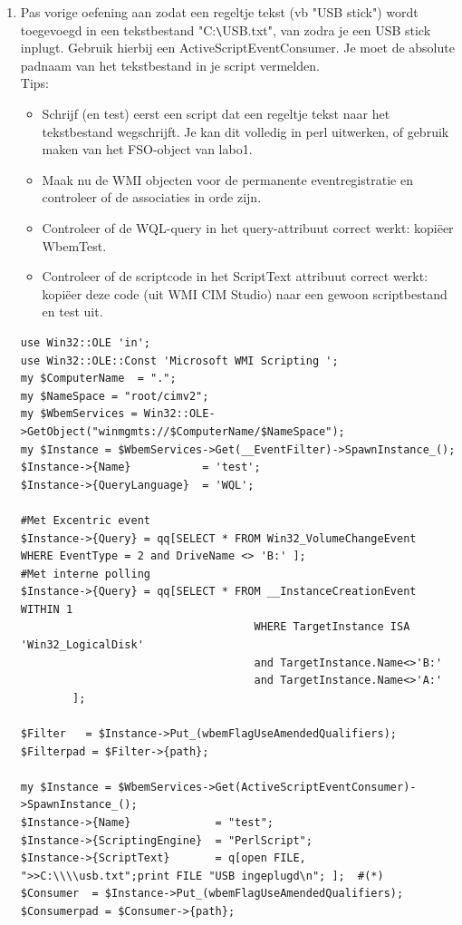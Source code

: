 \documentclass[11pt,a4paper]{report}
\begin{document}
\begin{enumerate}[resume]
	\item Pas vorige oefening aan zodat een regeltje tekst (vb "USB stick") wordt toegevoegd in een tekstbestand "C:\verb+\+USB.txt", van zodra je een USB stick inplugt. Gebruik hierbij een ActiveScriptEventConsumer. Je moet de absolute padnaam van het tekstbestand in je script vermelden.
	\\Tips:
	\begin{itemize}
		\item Schrijf (en test) eerst een script dat een regeltje tekst naar het tekstbestand wegschrijft. Je kan dit volledig in perl uitwerken, of gebruik maken van het FSO-object van labo1.
		\item Maak nu de WMI objecten voor de permanente eventregistratie en controleer of de associaties in orde zijn.
		\item Controleer of de WQL-query in het query-attribuut correct werkt: kopiëer WbemTest.
		\item Controleer of de scriptcode in het ScriptText attribuut correct werkt: kopiëer deze code (uit WMI CIM Studio) naar een gewoon scriptbestand en test uit.
	\end{itemize}
	\begin{lstlisting}
use Win32::OLE 'in';
use Win32::OLE::Const 'Microsoft WMI Scripting ';
my $ComputerName  = ".";
my $NameSpace = "root/cimv2";
my $WbemServices = Win32::OLE->GetObject("winmgmts://$ComputerName/$NameSpace");
my $Instance = $WbemServices->Get(__EventFilter)->SpawnInstance_();
$Instance->{Name}           = 'test';
$Instance->{QueryLanguage}  = 'WQL';

#Met Excentric event
$Instance->{Query} = qq[SELECT * FROM Win32_VolumeChangeEvent  WHERE EventType = 2 and DriveName <> 'B:' ];
#Met interne polling
$Instance->{Query} = qq[SELECT * FROM __InstanceCreationEvent WITHIN 1  
									WHERE TargetInstance ISA 'Win32_LogicalDisk' 
									and TargetInstance.Name<>'B:' 
									and TargetInstance.Name<>'A:' 
		];

$Filter   = $Instance->Put_(wbemFlagUseAmendedQualifiers);
$Filterpad = $Filter->{path};

my $Instance = $WbemServices->Get(ActiveScriptEventConsumer)->SpawnInstance_();
$Instance->{Name}             = "test";
$Instance->{ScriptingEngine}  = "PerlScript";
$Instance->{ScriptText}       = q[open FILE, ">>C:\\\\usb.txt";print FILE "USB ingeplugd\n"; ];  #(*)
$Consumer  = $Instance->Put_(wbemFlagUseAmendedQualifiers);
$Consumerpad = $Consumer->{path};


\end{lstlisting}
\end{enumerate}
\end{document}
